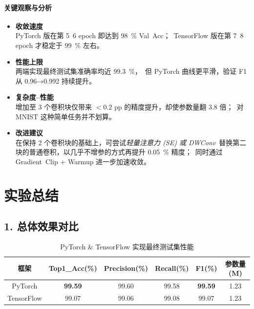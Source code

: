\documentclass[UTF8]{article}
\begin{document}
\paragraph{关键观察与分析}
\begin{itemize}
    \item \textbf{收敛速度}\\
          PyTorch 版在第 5~6 epoch 即达到 \SI{98}{\percent} Val~Acc；\
          TensorFlow 版在第 7~8 epoch 才稳定于 \SI{99}{\percent} 左右。
    \item \textbf{性能上限}\\
          两端实现最终测试集准确率均近 \SI{99.3}{\percent}，\
          但 PyTorch 曲线更平滑，验证 F1 从 0.96→0.992 持续提升。
    \item \textbf{复杂度--性能}\\
          增加至 3 个卷积块仅带来 $<0.2$ pp 的精度提升，却使参数量翻 3.8 倍；\
          对 MNIST 这种简单任务并不划算。
    \item \textbf{改进建议}\\
          在保持 2 个卷积块的基础上，可尝试\emph{轻量注意力 (SE) 或 DWConv}\
          替换第二块的普通卷积，以几乎不增参的方式再提升 \SI{0.05}{\percent} 精度；\
          同时通过 Gradient~Clip + Warmup 进一步加速收敛。
\end{itemize}



\section*{实验总结}

\subsection*{1. 总体效果对比}
\begin{table}[H]\centering
\caption{PyTorch \& TensorFlow 实现最终测试集性能}
\begin{tabular}{cccccc}
\hline
框架 & Top1\_Acc(\%) & Precision(\%) & Recall(\%) & F1(\%) & 参数量(M) \\
\hline
PyTorch & \textbf{99.59} & 99.60 & 99.58 & \textbf{99.59} & 1.23 \\
TensorFlow & 99.07 & 99.06 & 99.08 & 99.07 & 1.23 \\
\hline
\end{tabular}
\label{tab:final_perf}
\end{table}
\end{document}
